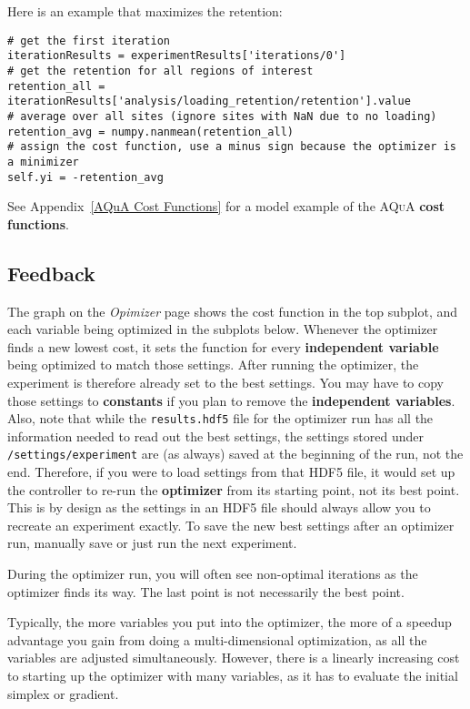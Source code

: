 \documentclass[pdftex,11pt,letterpaper]{article}
\begin{document}
Here is an example that maximizes the retention:

\begin{verbatim}
# get the first iteration
iterationResults = experimentResults['iterations/0']
# get the retention for all regions of interest
retention_all = iterationResults['analysis/loading_retention/retention'].value
# average over all sites (ignore sites with NaN due to no loading)
retention_avg = numpy.nanmean(retention_all)
# assign the cost function, use a minus sign because the optimizer is a minimizer
self.yi = -retention_avg
\end{verbatim}

See Appendix~\ref{AQuA Cost Functions} for a model example of the \textsc{AQuA} \textbf{cost functions}.

\subsection{Feedback}

The graph on the \textit{Opimizer} page shows the cost function in the top subplot, and each variable being optimized in the subplots below.  Whenever the optimizer finds a new lowest cost, it sets the function for every \textbf{independent variable} being optimized to match those settings.  After running the optimizer, the experiment is therefore already set to the best settings.  You may have to copy those settings to \textbf{constants} if you plan to remove the \textbf{independent variables}.  Also, note that while the \texttt{results.hdf5} file for the optimizer run has all the information needed to read out the best settings, the settings stored under \texttt{/settings/experiment} are (as always) saved at the beginning of the run, not the end.  Therefore, if you were to load settings from that HDF5 file, it would set up the controller to re-run the \textbf{optimizer} from its starting point, not its best point.  This is by design as the settings in an HDF5 file should always allow you to recreate an experiment exactly.  To save the new best settings after an optimizer run, manually save or just run the next experiment.

During the optimizer run, you will often see non-optimal iterations as the optimizer finds its way.  The last point is not necessarily the best point.

Typically, the more variables you put into the optimizer, the more of a speedup advantage you gain from doing a multi-dimensional optimization, as all the variables are adjusted simultaneously.  However, there is a linearly increasing cost to starting up the optimizer with many variables, as it has to evaluate the initial simplex or gradient.
\end{document}
